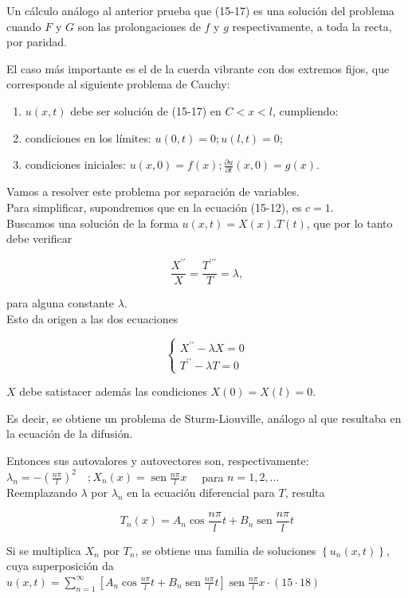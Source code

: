 \documentclass[10pt]{article}
\theoremstyle{plain}
\theoremstyle{definition}
\theoremstyle{remark}
\begin{document}
Un cálculo análogo al anterior prueba que (15-17) es una solución del problema cuando $F$ y $G$ son las prolongaciones de $f$ y $g$ respectivamente, a toda la recta, por paridad.

El caso más importante es el de la cuerda vibrante con dos extremos fijos, que corresponde al siguiente problema de Cauchy:

\begin{enumerate}
  \item $u(x, t)$ debe ser solución de (15-17) en $C<x<l$, cumpliendo:
  \item condiciones en los límites: $u(0, t)=0 ; u(l, t)=0$;
  \item condiciones iniciales: $u(x, 0)=f(x) ; \frac{\partial u}{\partial t}(x, 0)=g(x)$.
\end{enumerate}

Vamos a resolver este problema por separación de variables.\\
Para simplificar, supondremos que en la ecuación (15-12), es $c=1$.\\
Buscamos una solución de la forma $u(x, t)=X(x) . T(t)$, que por lo tanto debe verificar

$$
\frac{X^{\prime \prime}}{X}=\frac{T^{\prime \prime \prime}}{T}=\lambda,
$$

para alguna constante $\lambda$.\\
Esto da origen a las dos ecuaciones

$$
\left\{\begin{array}{l}
X^{\prime \prime}-\lambda X=0 \\
T^{\prime \prime}-\lambda T=0
\end{array}\right.
$$

$X$ debe satistacer además las condiciones $X(0)=X(l)=0$.

Es decir, se obtiene un problema de Sturm-Liouville, análogo al que resultaba en la ecuación de la difusión.

Entonces sus autovalores y autovectores son, respectivamente:\\
$\lambda_{n}=-\left(\frac{n \pi}{l}\right)^{2} \quad ; X_{n}(x)=\operatorname{sen} \frac{n \pi}{l} x \quad$ para $n=1,2, \ldots$\\
Reemplazando $\lambda$ por $\lambda_{n}$ en la ecuación diferencial para $T$, resulta

$$
T_{n}(x)=A_{n} \cos \frac{n \pi}{l} t+B_{n} \operatorname{sen} \frac{n \pi}{l} t
$$

Si se multiplica $X_{n}$ por $T_{n}$, se obtiene una familia de soluciones $\left\{u_{n}(x, t)\right\}$, cuya superposición da\\
$u(x, t)=\sum_{n=1}^{\infty}\left[A_{n} \cos \frac{n \pi}{l} t+B_{n} \operatorname{sen} \frac{n \pi}{l} t\right] \operatorname{sen} \frac{n \pi}{l} x \cdot(15 \cdot 18)$
\end{document}
